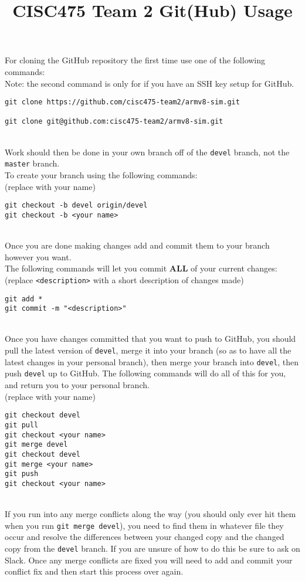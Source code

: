 \documentclass{article}
\begin{document}
\title{CISC475 Team 2 Git(Hub) Usage}
\date{}
\maketitle
\noindent
For cloning the GitHub repository the first time use one of the following commands:\\
Note: the second command is only for if you have an SSH key setup for GitHub.\\
\begin{verbatim}
git clone https://github.com/cisc475-team2/armv8-sim.git

git clone git@github.com:cisc475-team2/armv8-sim.git
\end{verbatim}
\ \\
Work should then be done in your own branch off of the {\tt devel} branch, not the {\tt master} branch.\\
To create your branch using the following commands:\\
(replace {\tt <your name>} with your name)\\
\begin{verbatim}
git checkout -b devel origin/devel
git checkout -b <your name>
\end{verbatim}
\ \\
Once you are done making changes add and commit them to your branch however you want.\\
The following commands will let you commit {\bf ALL} of your current changes:\\
(replace {\tt <description>} with a short description of changes made)\\
\begin{verbatim}
git add *
git commit -m "<description>"
\end{verbatim}
\ \\
Once you have changes committed that you want to push to GitHub, you should pull the latest version of {\tt devel}, merge it into your branch (so as to have all the latest changes in your personal branch), then merge your branch into {\tt devel}, then push {\tt devel} up to GitHub. The following commands will do all of this for you, and return you to your personal branch.\\
(replace {\tt <your name>} with your name)\\
\begin{verbatim}
git checkout devel
git pull
git checkout <your name>
git merge devel
git checkout devel
git merge <your name>
git push
git checkout <your name>
\end{verbatim}
\ \\
If you run into any merge conflicts along the way (you should only ever hit them when you run {\tt git merge devel}), you need to find them in whatever file they occur and resolve the differences between your changed copy and the changed copy from the {\tt devel} branch. If you are unsure of how to do this be sure to ask on Slack. Once any merge conflicts are fixed you will need to add and commit your conflict fix and then start this process over again.
\end{document}
